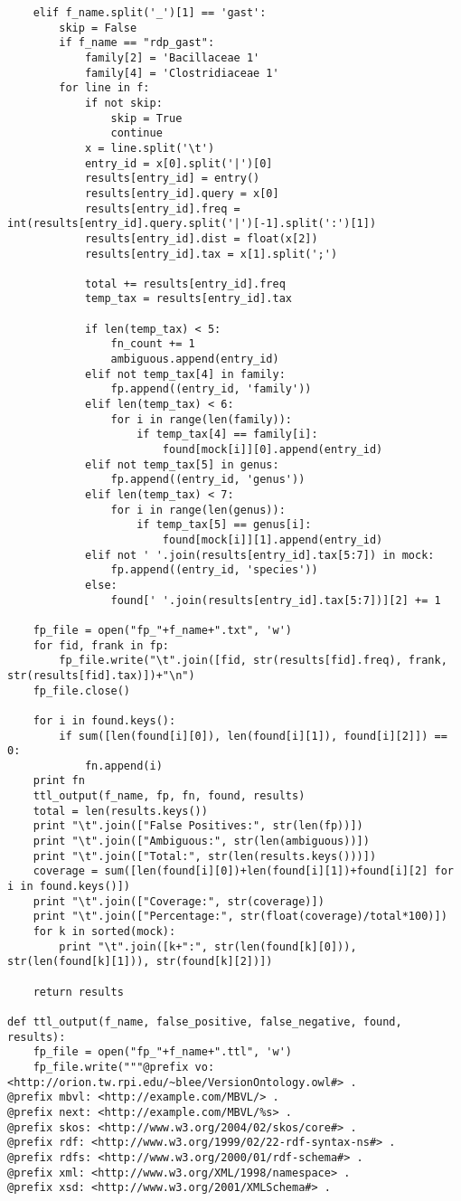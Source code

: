 \begin{verbatim}
	elif f_name.split('_')[1] == 'gast':
		skip = False
		if f_name == "rdp_gast":
			family[2] = 'Bacillaceae 1'
			family[4] = 'Clostridiaceae 1'
		for line in f:
			if not skip:
				skip = True
				continue
			x = line.split('\t')
			entry_id = x[0].split('|')[0]
			results[entry_id] = entry()
			results[entry_id].query = x[0]
			results[entry_id].freq = int(results[entry_id].query.split('|')[-1].split(':')[1])
			results[entry_id].dist = float(x[2])
			results[entry_id].tax = x[1].split(';')

			total += results[entry_id].freq
			temp_tax = results[entry_id].tax

			if len(temp_tax) < 5:
				fn_count += 1
				ambiguous.append(entry_id)
			elif not temp_tax[4] in family:
				fp.append((entry_id, 'family'))
			elif len(temp_tax) < 6:
				for i in range(len(family)):
					if temp_tax[4] == family[i]:
						found[mock[i]][0].append(entry_id)
			elif not temp_tax[5] in genus:
				fp.append((entry_id, 'genus'))
			elif len(temp_tax) < 7:
				for i in range(len(genus)):
					if temp_tax[5] == genus[i]:
						found[mock[i]][1].append(entry_id)
			elif not ' '.join(results[entry_id].tax[5:7]) in mock:
				fp.append((entry_id, 'species'))
			else:
				found[' '.join(results[entry_id].tax[5:7])][2] += 1

	fp_file = open("fp_"+f_name+".txt", 'w')
	for fid, frank in fp:
		fp_file.write("\t".join([fid, str(results[fid].freq), frank, str(results[fid].tax)])+"\n")
	fp_file.close()

	for i in found.keys():
		if sum([len(found[i][0]), len(found[i][1]), found[i][2]]) == 0:
			fn.append(i)
	print fn
	ttl_output(f_name, fp, fn, found, results)
	total = len(results.keys())
	print "\t".join(["False Positives:", str(len(fp))])
	print "\t".join(["Ambiguous:", str(len(ambiguous))])
	print "\t".join(["Total:", str(len(results.keys()))])
	coverage = sum([len(found[i][0])+len(found[i][1])+found[i][2] for i in found.keys()])
	print "\t".join(["Coverage:", str(coverage)])
	print "\t".join(["Percentage:", str(float(coverage)/total*100)])
	for k in sorted(mock):
		print "\t".join([k+":", str(len(found[k][0])), str(len(found[k][1])), str(found[k][2])])
	
	return results

def ttl_output(f_name, false_positive, false_negative, found, results):
	fp_file = open("fp_"+f_name+".ttl", 'w')
	fp_file.write("""@prefix vo: <http://orion.tw.rpi.edu/~blee/VersionOntology.owl#> .
@prefix mbvl: <http://example.com/MBVL/> .
@prefix next: <http://example.com/MBVL/%s> .
@prefix skos: <http://www.w3.org/2004/02/skos/core#> .
@prefix rdf: <http://www.w3.org/1999/02/22-rdf-syntax-ns#> .
@prefix rdfs: <http://www.w3.org/2000/01/rdf-schema#> .
@prefix xml: <http://www.w3.org/XML/1998/namespace> .
@prefix xsd: <http://www.w3.org/2001/XMLSchema#> .


\end{verbatim}
